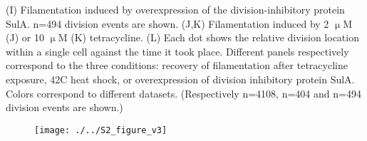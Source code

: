 \documentclass[]{article}
\begin{document}
{  (I) Filamentation induced by overexpression of the division-inhibitory protein SulA. n=494 division events are shown.
  (J,K) Filamentation induced by 2 $\upmu$M (J) or 10 $\upmu$M 
  (K) tetracycline. 
  (L) Each dot shows the relative division location within a single cell against the time it took place. Different panels respectively correspond to the three conditions: recovery of filamentation after tetracycline exposure, 42C heat shock, or overexpression of division inhibitory protein SulA.
  Colors correspond to different datasets. 
  (Respectively n=4108, n=404 and n=494 division events are shown.) 
}

\begin{figure}
	\centering
	\texttt{[image: ./../S2\_figure\_v3]}
\end{figure}	

\clearpage
\end{document}
